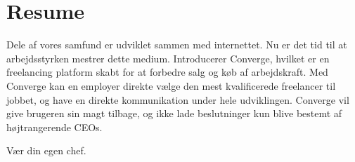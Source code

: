 \chapter{Resume}

Dele af vores samfund er udviklet sammen med internettet. Nu er det tid til at arbejdsstyrken mestrer dette medium. Introducerer Converge, hvilket er en freelancing platform skabt for at forbedre salg og køb af arbejdskraft. Med Converge kan en employer direkte vælge den mest kvalificerede freelancer til jobbet, og have en direkte kommunikation under hele udviklingen. Converge vil give brugeren sin magt tilbage, og ikke lade beslutninger kun blive bestemt af højtrangerende CEOs.

Vær din egen chef.
